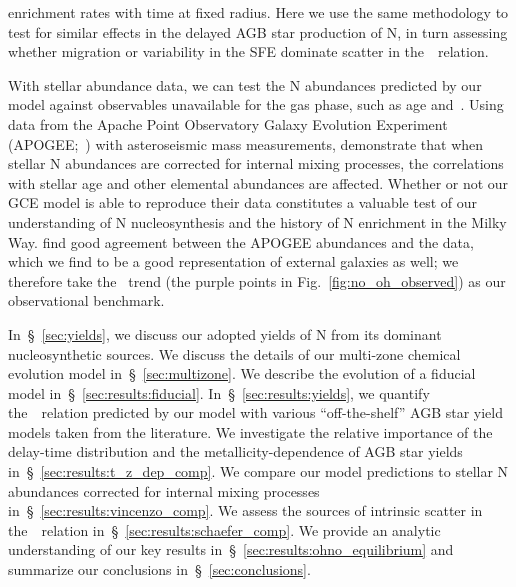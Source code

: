 \documentclass[ms.tex]{subfiles}
\begin{document}
enrichment rates with time at fixed radius.
Here we use the same methodology to test for similar effects in the delayed AGB
star production of N, in turn assessing whether migration or variability in the
SFE dominate scatter in the~\ohno~relation.
\par
With stellar abundance data, we can test the N abundances predicted by our
model against observables unavailable for the gas phase, such as age and~\ofe.
Using data from the Apache Point Observatory Galaxy Evolution Experiment
(APOGEE;~\citealp{Majewski2017}) with asteroseismic mass measurements,
\citet{Vincenzo2021} demonstrate that when stellar N abundances are corrected
for internal mixing processes, the correlations with stellar age and other
elemental abundances are affected.
Whether or not our GCE model is able to reproduce their data constitutes a
valuable test of our understanding of N nucleosynthesis and the history of N
enrichment in the Milky Way.
\citet{Vincenzo2021} find good agreement between the APOGEE abundances and the
\citet{Dopita2016} data, which we find to be a good representation of external
galaxies as well; we therefore take the~\citet{Dopita2016} trend (the purple
points in Fig.~\ref{fig:no_oh_observed}) as our observational benchmark.
\par
In~\S~\ref{sec:yields}, we discuss our adopted yields of N from its dominant
nucleosynthetic sources.
We discuss the details of our multi-zone chemical evolution model
in~\S~\ref{sec:multizone}.
We describe the evolution of a fiducial model in~\S~\ref{sec:results:fiducial}.
In~\S~\ref{sec:results:yields}, we quantify the~\ohno~relation predicted by our
model with various ``off-the-shelf'' AGB star yield models taken from the
literature.
We investigate the relative importance of the delay-time distribution and the
metallicity-dependence of AGB star yields in~\S~\ref{sec:results:t_z_dep_comp}.
We compare our model predictions to stellar N abundances corrected for internal
mixing processes in~\S~\ref{sec:results:vincenzo_comp}.
We assess the sources of intrinsic scatter in the~\ohno~relation
in~\S~\ref{sec:results:schaefer_comp}.
We provide an analytic understanding of our key results
in~\S~\ref{sec:results:ohno_equilibrium} and summarize our conclusions
in~\S~\ref{sec:conclusions}.
\end{document}
